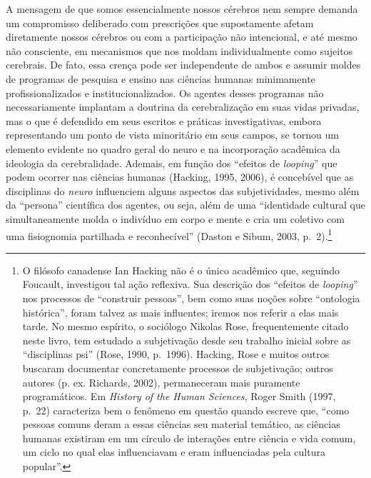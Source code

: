 A mensagem de que somos essencialmente nossos cérebros nem sempre
demanda um compromisso deliberado com prescrições que supostamente
afetam diretamente nossos cérebros ou com a participação não intencional,
e até mesmo não consciente, em mecanismos que nos moldam individualmente
como sujeitos cerebrais. De fato, essa crença pode ser independente de
ambos e assumir moldes de programas de pesquisa e ensino nas ciências
humanas minimamente profissionalizados e institucionalizados. Os agentes
desses programas não necessariamente implantam a doutrina da
cerebralização em suas vidas privadas, mas o que é defendido em seus
escritos e práticas investigativas, embora representando um ponto de
vista minoritário em seus campos, se tornou um elemento evidente no
quadro geral do neuro e na incorporação acadêmica da ideologia da
cerebralidade. Ademais, em função dos ``efeitos de \emph{looping}'' que podem
ocorrer nas ciências humanas (Hacking, 1995, 2006), é concebível que as
disciplinas do \emph{neuro} influenciem alguns aspectos das
subjetividades, mesmo além da ``persona'' científica dos agentes, ou seja,
além de uma ``identidade cultural que simultaneamente molda o indivíduo
em corpo e mente e cria um coletivo com uma fisiognomia partilhada e
reconhecível'' (Daston e Sibum, 2003, p.~2).\footnote[1]{O filósofo canadense Ian Hacking não é o único acadêmico que,
seguindo Foucault, investigou tal ação reflexiva. Sua
descrição dos ``efeitos de \emph{looping}'' nos processos de ``construir
pessoas'', bem como suas noções sobre ``ontologia histórica'', foram
talvez as mais influentes; iremos nos referir a elas mais tarde. No
mesmo espírito, o sociólogo Nikolas Rose, frequentemente citado neste
livro, tem estudado a subjetivação desde seu trabalho inicial sobre as
``disciplinas psi'' (Rose, 1990, p.~1996). Hacking, Rose e muitos outros
buscaram documentar concretamente processos de subjetivação; outros
autores (p. ex. Richards, 2002), permaneceram mais puramente
programáticos. Em \emph{History of the Human Sciences}, Roger Smith
(1997, p.~22) caracteriza bem o fenômeno em questão quando escreve que,
``como pessoas comuns deram a essas ciências seu material temático, as
ciências humanas existiram em um círculo de interações entre ciência e
vida comum, um ciclo no qual elas influenciavam e eram influenciadas
pela cultura popular''.}

